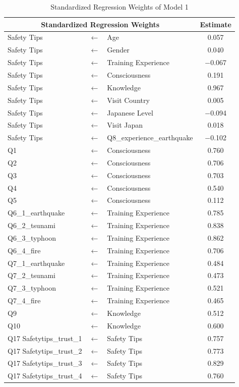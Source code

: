 \begin{table}[h]
  \caption{Standardized Regression Weights of Model 1 }
  \label{table10}
  \centering
  \begin{tabular}{|l|c|l|c|}
 \hline
 \multicolumn{3}{|c|}{Standardized Regression Weights} & Estimate \\
 \hline
  Safety Tips & $\longleftarrow$ & Age & 0.057 \\ 
  Safety Tips & $\longleftarrow$ & Gender &0.040 \\
  Safety Tips & $\longleftarrow$ & Training Experience & $-$0.067 \\
  Safety Tips & $\longleftarrow$ & Consciousness & 0.191 \\
  Safety Tips & $\longleftarrow$ & Knowledge & 0.967 \\
  Safety Tips & $\longleftarrow$ & Visit Country & 0.005 \\
  Safety Tips & $\longleftarrow$ & Japanese Level & $-$0.094 \\
  Safety Tips & $\longleftarrow$ & Visit Japan & 0.018 \\
  Safety Tips & $\longleftarrow$ & Q8\_experience\_earthquake & $-$0.102 \\
  Q1              & $\longleftarrow$ & Consciousness & 0.760\\
  Q2              & $\longleftarrow$ & Consciousness & 0.706 \\
  Q3              & $\longleftarrow$ & Consciousness & 0.703\\
  Q4              & $\longleftarrow$ & Consciousness & 0.540 \\
  Q5              & $\longleftarrow$ & Consciousness & 0.112 \\
  Q6\_1\_earthquake & $\longleftarrow$ & Training Experience & 0.785 \\
  Q6\_2\_tsunami & $\longleftarrow$ & Training Experience & 0.838 \\
  Q6\_3\_typhoon & $\longleftarrow$ & Training Experience & 0.862 \\
  Q6\_4\_fire & $\longleftarrow$ & Training Experience & 0.706 \\
  Q7\_1\_earthquake & $\longleftarrow$ & Training Experience & 0.484 \\
  Q7\_2\_tsunami & $\longleftarrow$ & Training Experience & 0.473 \\
  Q7\_3\_typhoon & $\longleftarrow$ & Training Experience & 0.521 \\
  Q7\_4\_fire & $\longleftarrow$ & Training Experience & 0.465\\
  Q9             & $\longleftarrow$ & Knowledge & 0.512\\
  Q10           & $\longleftarrow$ & Knowledge & 0.600 \\
  Q17 Safetytips\_trust\_1 & $\longleftarrow$ & Safety Tips & 0.757 \\
  Q17 Safetytips\_trust\_2 & $\longleftarrow$ & Safety Tips & 0.773 \\
  Q17 Safetytips\_trust\_3 & $\longleftarrow$ & Safety Tips & 0.829 \\
  Q17 Safetytips\_trust\_4 & $\longleftarrow$ & Safety Tips & 0.760 \\
 \hline
  \end{tabular}
\end{table}
